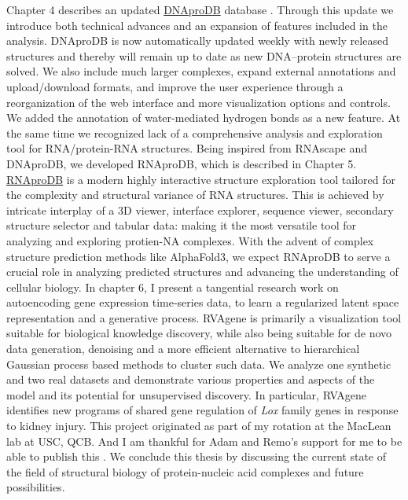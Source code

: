 Chapter 4 describes an updated \href{https://dnaprodb.usc.edu}{DNAproDB} database \citep{Sagendorf2017, Sagendorf2020}. Through this update we introduce both technical advances and an expansion of features included in the analysis. DNAproDB is now automatically updated weekly with newly released structures and thereby will remain up to date as new DNA–protein structures are solved. We also include much larger
complexes, expand external annotations and upload/download formats, and improve the user
experience through a reorganization of the web interface and more visualization options and controls. We added the annotation of water-mediated hydrogen bonds as a new feature.
At the same time we recognized lack of a comprehensive analysis and exploration tool for RNA/protein-RNA structures. Being inspired from RNAscape and DNAproDB, we developed RNAproDB, which is described in Chapter 5. \href{https://rohslab.usc.edu/rnaprodb/}{RNAproDB} is a modern highly interactive structure exploration tool tailored for the complexity and structural variance of RNA structures. This is achieved by intricate interplay of a 3D viewer, interface explorer, sequence viewer, secondary structure selector and tabular data:  making it the most versatile tool for analyzing and exploring protien-NA complexes. With the advent of complex structure prediction methods like AlphaFold3, we expect RNAproDB to serve a crucial role in analyzing predicted structures and advancing the understanding of cellular biology.
In chapter 6, I present a tangential research work on autoencoding gene expression time-series data, to learn a regularized latent space representation and a generative process. RVAgene is primarily a visualization tool suitable for biological
knowledge discovery, while also being suitable for de novo data generation, denoising and a more
efficient alternative to hierarchical Gaussian process based methods \citep{mcdowell2018} to cluster such data. We
analyze one synthetic and two real datasets and demonstrate various properties and aspects of the
model and its potential for unsupervised discovery.  In particular, RVAgene identifies new programs of
shared gene regulation of \textit{Lox} family genes in response to kidney injury. This project originated as part of my rotation at the MacLean lab at USC, QCB. And I am thankful for Adam and Remo's support for me to be able to publish this \citep{Mitra2021}.
We conclude this thesis by discussing the current state of the field of structural biology of protein-nucleic acid complexes and future possibilities.
